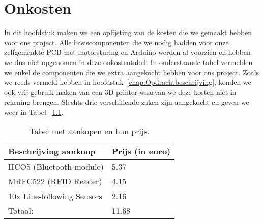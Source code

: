 \chapter{Onkosten}
In dit hoofdstuk maken we een oplijsting van de kosten die we gemaakt hebben voor ons project.  Alle basiscomponenten die we nodig hadden voor onze zelfgemaakte PCB met motorsturing en Arduino werden al voorzien en hebben we dus niet opgenomen in deze onkostentabel. In onderstaande tabel vermelden we enkel de componenten die we extra aangekocht hebben voor ons project. Zoals we reeds vermeld hebben in hoofdstuk~\ref{chap:Opdrachtbeschrijving}, konden we ook vrij gebruik maken van een 3D-printer waarvan we deze kosten niet in rekening brengen. Slechts drie verschillende zaken zijn aangekocht en geven we weer in Tabel ~\ref{table:Onkosten}.\\
\begin {table}[H]
\caption {Tabel met aankopen en hun prijs.} \label{table:Onkosten}
\begin{center}
	\begin{tabular}{ | l | l | }
	\hline
	Beschrijving aankoop & Prijs (in euro) \\ \hline
	\hline
	HCO5 (Bluetooth module) & 5.37 \\ \hline
	MRFC522 (RFID Reader) & 4.15 \\ \hline
	10x Line-following Sensors & 2.16 \\ \hline \hline
	Totaal: & 11.68 \\ \hline
	\end{tabular}
\end{center}
\end{table}
